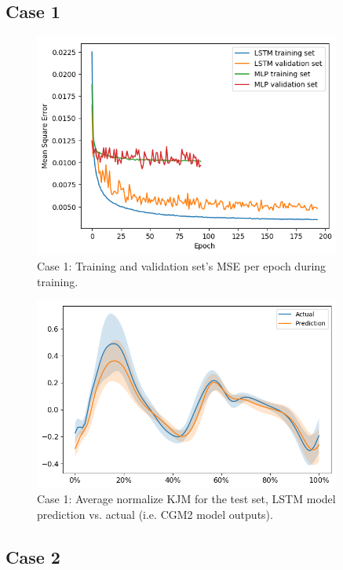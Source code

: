 \documentclass[../main.tex]{subfiles}
\begin{document}
\subsection{Case 1}
\label{sec:results-case1}
\begin{figure}[ht!]
    \centering
    \includegraphics[width=0.9\textwidth]{img/results/training_history/Case1_LSTMvsMLP_training.png}
    \caption{Case 1: Training and validation set's \ac{MSE} per epoch during training.}
    \label{fig:cas1-lstm-vs-mlp-training}
\end{figure}

\begin{figure}[ht!]
    \centering
    \includegraphics[width=0.9\textwidth]{img/results/test_prediction_evaluation/Case1_LSTM_test_prediction.png}
    \caption{Case 1: Average normalize \ac{KJM} for the test set, \ac{LSTM} model prediction vs. actual (i.e. CGM2 model outputs).}
    \label{fig:my_label}
\end{figure}

\subsection{Case 2}
\label{sec:results-case1}
\end{document}
